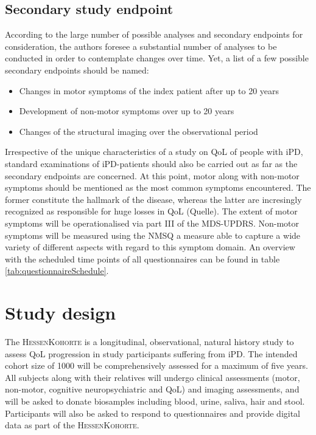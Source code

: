 \subsection{Secondary study endpoint}
According to the large number of possible analyses and secondary endpoints for consideration, the authors foresee a substantial
number of analyses to be conducted in order to contemplate changes over time. Yet, a list of a few possible secondary endpoints should be named:
\begin{itemize}
  \item{Changes in motor symptoms of the index patient after up to 20 years}
  \item{Development of non-motor symptoms over up to 20 years}
  \item{Changes of the structural imaging over the observational period} 
\end{itemize}
Irrespective of the unique characteristics of a study on \ac{QoL} of people with \ac{iPD}, standard examinations of \ac{iPD}-patients should also be carried out as far as the secondary endpoints are concerned. At this point, motor along with non-motor symptoms should be mentioned as the most common symptoms encountered. The former constitute the hallmark of the disease, whereas the latter are incresingly recognized as responsible for huge losses in \ac{QoL} (Quelle). The extent of motor symptoms will be operationalised via part III of the \ac{MDS-UPDRS}\cite{goetz2007updrs}. Non-motor symptoms will be measured using the \ac{NMSQ} a measure able to capture a wide variety of different aspects with regard to this symptom domain. An overview with the scheduled time points of all questionnaires can be found in table \ref{tab:questionnaireSchedule}.

\section{Study design}
The \textsc{HessenKohorte} is a longitudinal, observational, natural history study to assess \ac{QoL} progression in study participants suffering from \ac{iPD}. The intended cohort size of \num[round-precision = 0, round-mode = places]{1000}{} will be comprehensively assessed for a maximum of five years. All subjects along with their relatives will undergo clinical assessments (motor, non-motor, cognitive neuropsychiatric and \ac{QoL}) and imaging assessments, and will be asked to donate biosamples including blood, urine, saliva, hair and stool. Participants will also be asked to respond to questionnaires and provide digital data as part of the \textsc{HessenKohorte}.

